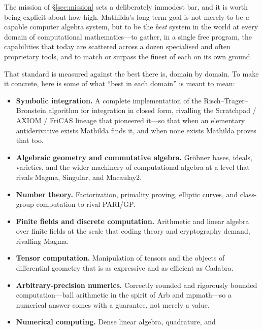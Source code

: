 The mission of \S\ref{sec:mission} sets a deliberately immodest bar, and it is worth
being explicit about how high. Mathilda's long-term goal is not merely to be \emph{a}
capable computer algebra system, but to be the \emph{best} system in the world at
every domain of computational mathematics---to gather, in a single free program, the
capabilities that today are scattered across a dozen specialised and often
proprietary tools, and to match or surpass the finest of each on its own ground.

That standard is measured against the best there is, domain by domain. To make it
concrete, here is some of what ``best in each domain'' is meant to mean:

\begin{itemize}
  \item \textbf{Symbolic integration.} A complete implementation of the
        Risch--Trager--Bronstein algorithm
        for integration in closed form, rivalling the Scratchpad / AXIOM / FriCAS
        lineage that pioneered it---so that when an elementary antiderivative exists
        Mathilda finds it, and when none exists Mathilda proves that too.
  \item \textbf{Algebraic geometry and commutative algebra.} Gr\"obner bases,
        ideals, varieties, and the wider machinery of computational algebra at a level
        that rivals Magma, Singular, and Macaulay2.
  \item \textbf{Number theory.} Factorization, primality proving, elliptic curves,
        and class-group computation to rival PARI/GP.
  \item \textbf{Finite fields and discrete computation.} Arithmetic and linear
        algebra over finite fields at the scale that coding theory and cryptography
        demand, rivalling Magma.
  \item \textbf{Tensor computation.} Manipulation of tensors and the objects of
        differential geometry that is as expressive and as efficient as Cadabra.
  \item \textbf{Arbitrary-precision numerics.} Correctly rounded and rigorously
        bounded computation---ball arithmetic in the spirit of Arb and mpmath---so a
        numerical answer comes with a guarantee, not merely a value.
  \item \textbf{Numerical computing.} Dense linear algebra, quadrature, and

\end{itemize}
